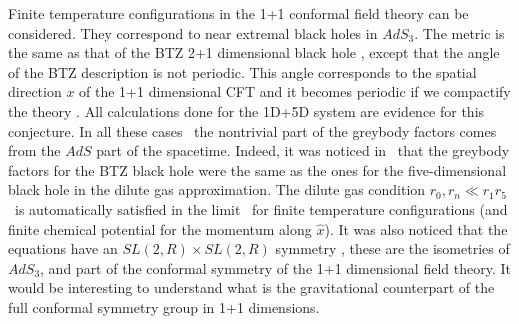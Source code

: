  
Finite temperature configurations in the 1+1 conformal field 
theory can be considered. They  correspond to near extremal black holes
in $AdS_3$. The metric is the same as that of the BTZ 2+1 dimensional 
black hole \btz ,
except  that the angle of the BTZ description is not periodic. This angle
 corresponds
to the spatial direction $x$ of the 1+1 dimensional CFT and 
it becomes  periodic if we  compactify the 
theory 
  .
All calculations  done for the 1D+5D system 
are  evidence for this conjecture. In all these cases \greycalc\ the
nontrivial part of the greybody factors comes from the $AdS$ part of 
the spacetime. Indeed, it was noticed in \irish\ that
the greybody factors for the BTZ black hole were the same as the
ones for the five-dimensional black hole in the dilute gas approximation.
The dilute gas condition $r_0, r_n \ll r_1 r_5 $ \ghas\  is 
automatically satisfied
in the limit \lowenlim\ for finite temperature configurations
 (and finite chemical potential for
the
momentum along $\hat x$).
 It was also noticed that the 
equations have an $SL(2,R) \times SL(2,R)$ symmetry \finn , these 
 are  the
isometries   of $AdS_3$, and part of the
 conformal symmetry of the 1+1 dimensional
field
theory.  
It would be interesting to understand what  is the gravitational 
counterpart of the full conformal symmetry group in 1+1 dimensions. 



%


